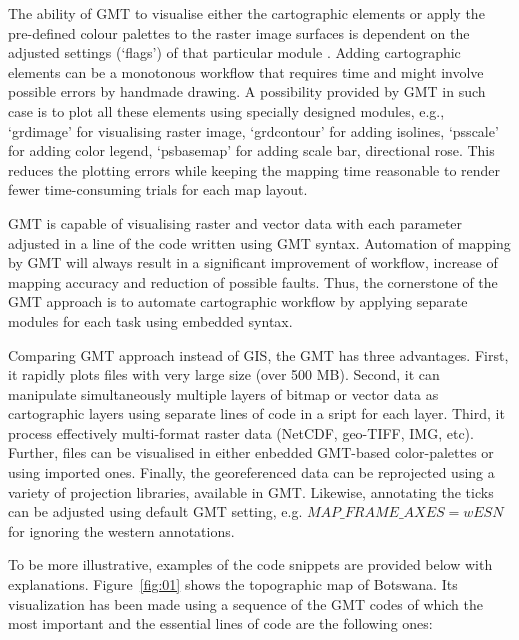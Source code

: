 \documentclass[ijgi,article,submit,pdftex,moreauthors]{Definitions/mdpi}
\begin{document}
 The ability of GMT to visualise either the cartographic elements or apply the pre-defined colour palettes to the raster image surfaces is dependent on the adjusted settings (‘flags’) of that particular module \cite{Lemenkova202213}. Adding cartographic elements can be a monotonous workflow that requires time and might involve possible errors by handmade drawing. A possibility provided by GMT in such case is to plot all these elements using specially designed modules, e.g., ‘grdimage’ for visualising raster image, ‘grdcontour’ for adding isolines, ‘psscale’ for adding color legend, ‘psbasemap’ for adding scale bar, directional rose. This reduces the plotting errors while keeping the mapping time reasonable to render fewer time-consuming trials for each map layout.

GMT is capable of visualising raster and vector data with each parameter adjusted in a line of the code written using GMT syntax. Automation of mapping by GMT will always result in a significant improvement of workflow, increase of mapping accuracy and reduction of possible faults. Thus, the cornerstone of the GMT approach is to automate cartographic workflow by applying separate modules for each task using embedded syntax. 	

Comparing GMT approach instead of GIS, the GMT has three advantages. First, it rapidly plots files with very large size (over 500 MB). Second, it can manipulate simultaneously multiple layers of bitmap or vector data as cartographic layers using separate lines of code in a sript for each layer. Third, it process effectively multi-format raster data (NetCDF, geo-TIFF, IMG, etc). Further, files can be visualised in either enbedded GMT-based color-palettes or using imported ones. Finally, the georeferenced data can be reprojected using a variety of projection libraries, available in GMT. Likewise, annotating the ticks can be adjusted using default GMT setting, e.g. $MAP\_FRAME\_AXES=wESN$ for ignoring the western annotations.

To be more illustrative, examples of the code snippets are provided below with explanations. Figure~\ref{fig:01} shows the topographic map of Botswana. Its visualization has been made using a sequence of the GMT codes of which the most important and the essential lines of code are the following ones:
\end{document}
